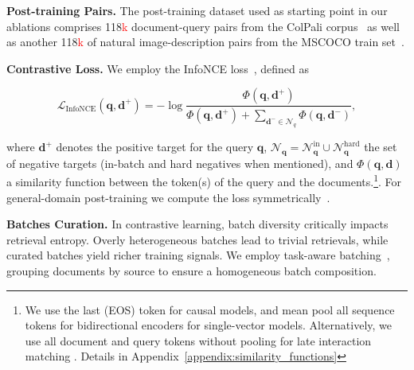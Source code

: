 

\noindent\textbf{Post-training Pairs.} The post-training dataset used as starting point in our ablations comprises 118\textcolor{red}{k} document-query pairs from the ColPali corpus~\cite{faysse2025colpaliefficientdocumentretrieval} as well as another 118\textcolor{red}{k} of natural image-description pairs from the MSCOCO train set~\citep{lin2015microsoftcococommonobjects}.

\textbf{Contrastive Loss.} We employ the InfoNCE loss~\citep{oord2019representationlearningcontrastivepredictive}, defined as

\begin{equation}
\mathcal{L}_{\text{InfoNCE}}(\mathbf{q},\mathbf{d^+})
  =-\log\frac{\Phi(\mathbf{q},\mathbf{d^+})}{\Phi(\mathbf{q},\mathbf{d^+}) + \sum_{\mathbf{d^-}\in\mathcal{N}_q}\Phi(\mathbf{q},\mathbf{d^-})},
\end{equation}

where $\mathbf{d^+}$ denotes the positive target for the query $\mathbf{q}$, $\mathcal{N}_\mathbf{q}=\mathcal{N}_\mathbf{q}^{\text{in}} \cup \mathcal{N}_\mathbf{q}^{\text{hard}}$ the set of negative targets (in-batch and hard negatives when mentioned), and $\Phi(\mathbf{q},\mathbf{d})$ a similarity function between the token(s) of the query and the documents.\footnote{We use the last (EOS) token for causal models, and mean pool all sequence tokens for bidirectional encoders for single-vector models. Alternatively, we use all document and query tokens without pooling for late interaction matching \citep{faysse2025colpaliefficientdocumentretrieval}. Details in Appendix~\ref{appendix:similarity_functions}}. 
For general-domain post-training we compute the loss symmetrically~\citep{radford2021learningtransferablevisualmodels}.

\textbf{Batches Curation.} In contrastive learning, batch diversity critically impacts retrieval entropy. Overly heterogeneous batches lead to trivial retrievals, while curated batches yield richer training signals. We employ task-aware batching~\citep{li2023generaltextembeddingsmultistage}, grouping documents by source to ensure a homogeneous batch composition.


